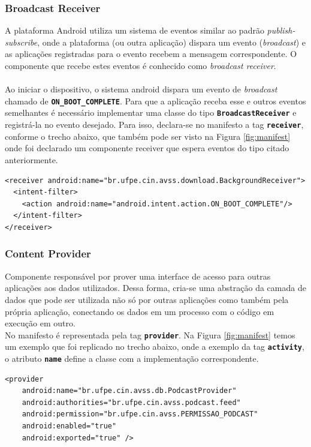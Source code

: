 \documentclass[a4paper,12pt]{article}
\begin{document}
\subsubsection{Broadcast Receiver}

A plataforma Android utiliza um sistema de eventos similar ao padrão \textit{publish-subscribe}, onde a plataforma (ou outra aplicação) dispara um evento (\textit{broadcast}) e as aplicações registradas para o evento recebem a mensagem correspondente. O componente que recebe estes eventos é conhecido como \textit{broadcast receiver}.\\
\\
Ao iniciar o dispositivo, o sistema android dispara um evento de \textit{broadcast} chamado de {\small\texttt{\textbf{ON\_BOOT\_COMPLETE}}}. Para que a aplicação receba esse e outros eventos semelhantes é necessário implementar uma classe do tipo {\small\texttt{\textbf{BroadcastReceiver}}} e registrá-la no evento desejado. Para isso, declara-se no manifesto a tag {\small\texttt{\textbf{receiver}}}, conforme o trecho abaixo, que também pode ser visto na Figura \ref{fig:manifest} onde foi declarado um componente receiver que espera eventos do tipo citado anteriormente.
{\fontsize{9pt}{12pt}
\begin{verbatim}
<receiver android:name="br.ufpe.cin.avss.download.BackgroundReceiver">
  <intent-filter>
    <action android:name="android.intent.action.ON_BOOT_COMPLETE"/>
  </intent-filter>
</receiver>
\end{verbatim}
}

\subsubsection{Content Provider}
\label{sec:provider}
Componente responsável por prover uma interface de acesso para outras aplicações aos dados utilizados. Dessa forma, cria-se uma abstração da camada de dados que pode ser utilizada não só por outras aplicações como também pela própria aplicação, conectando os dados em um processo com o código em execução em outro.\\

No manifesto é representada pela tag {\small\texttt{\textbf{provider}}}. Na Figura \ref{fig:manifest} temos um exemplo que foi replicado no trecho abaixo, onde a exemplo da tag {\small\texttt{\textbf{activity}}}, o atributo {\small\texttt{\textbf{name}}} define a classe com a implementação correspondente.\\

{\fontsize{9pt}{12pt}
\begin{verbatim}
<provider
    android:name="br.ufpe.cin.avss.db.PodcastProvider"
    android:authorities="br.ufpe.cin.avss.podcast.feed"
    android:permission="br.ufpe.cin.avss.PERMISSAO_PODCAST"
    android:enabled="true"
    android:exported="true" />

\end{verbatim}
}
\end{document}
